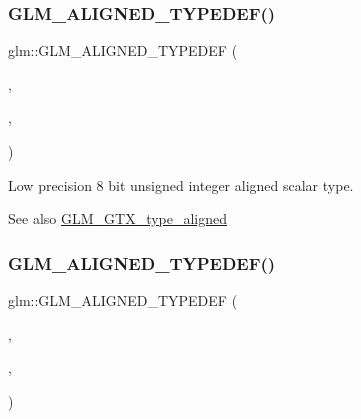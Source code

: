 \subsubsection{\texorpdfstring{G\+L\+M\+\_\+\+A\+L\+I\+G\+N\+E\+D\+\_\+\+T\+Y\+P\+E\+D\+E\+F()}{GLM\_ALIGNED\_TYPEDEF()}\hspace{0.1cm}{\footnotesize\ttfamily [73/209]}}
{\footnotesize\ttfamily glm\+::\+G\+L\+M\+\_\+\+A\+L\+I\+G\+N\+E\+D\+\_\+\+T\+Y\+P\+E\+D\+EF (\begin{DoxyParamCaption}\item[{\hyperlink{group__gtc__type__precision_ga0910ef24195d1b8b26e34d73148c0c45}{lowp\+\_\+uint8\+\_\+t}}]{,  }\item[{aligned\+\_\+lowp\+\_\+uint8\+\_\+t}]{,  }\item[{1}]{ }\end{DoxyParamCaption})}

Low precision 8 bit unsigned integer aligned scalar type. \begin{DoxySeeAlso}{See also}
\hyperlink{group__gtx__type__aligned}{G\+L\+M\+\_\+\+G\+T\+X\+\_\+type\+\_\+aligned} 
\end{DoxySeeAlso}
\mbox{\label{group__gtx__type__aligned_gaf2b58f5fb6d4ec8ce7b76221d3af43e1}} 
\subsubsection{\texorpdfstring{G\+L\+M\+\_\+\+A\+L\+I\+G\+N\+E\+D\+\_\+\+T\+Y\+P\+E\+D\+E\+F()}{GLM\_ALIGNED\_TYPEDEF()}\hspace{0.1cm}{\footnotesize\ttfamily [74/209]}}
{\footnotesize\ttfamily glm\+::\+G\+L\+M\+\_\+\+A\+L\+I\+G\+N\+E\+D\+\_\+\+T\+Y\+P\+E\+D\+EF (\begin{DoxyParamCaption}\item[{\hyperlink{group__gtc__type__precision_ga9a71176a4e5bc61951f9e9197d9c80e1}{lowp\+\_\+uint16\+\_\+t}}]{,  }\item[{aligned\+\_\+lowp\+\_\+uint16\+\_\+t}]{,  }\item[{2}]{ }\end{DoxyParamCaption})}

